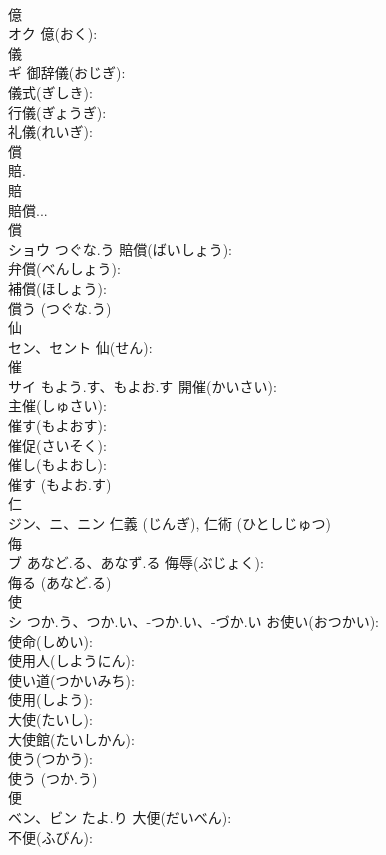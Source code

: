 \documentclass[8pt]{extreport}
\begin{document}
\begin{CJK}{UTF8}{min}
\\	億			
\\	オク		億(おく): 
\\	儀			
\\	ギ		御辞儀(おじぎ): 
\\	儀式(ぎしき): 
\\	行儀(ぎょうぎ): 
\\	礼儀(れいぎ): 
\\	償			
\\	賠. 
\\	賠 
\\	賠償... 
\\	償 
\\	ショウ	つぐな.う	賠償(ばいしょう): 
\\	弁償(べんしょう): 
\\	補償(ほしょう): 
\\	償う (つぐな.う)
\\	仙			
\\	セン、セント		仙(せん): 
\\	催			
\\	サイ	もよう.す、もよお.す	開催(かいさい): 
\\	主催(しゅさい): 
\\	催す(もよおす): 
\\	催促(さいそく): 
\\	催し(もよおし): 
\\	催す (もよお.す)
\\	仁			
\\	ジン、ニ、ニン			仁義 (じんぎ), 仁術 (ひとしじゅつ)
\\	侮			
\\	ブ	あなど.る、あなず.る	侮辱(ぶじょく): 
\\	侮る (あなど.る)
\\	使			
\\	シ	つか.う、つか.い、-つか.い、-づか.い	お使い(おつかい): 
\\	使命(しめい): 
\\	使用人(しようにん): 
\\	使い道(つかいみち): 
\\	使用(しよう): 
\\	大使(たいし): 
\\	大使館(たいしかん): 
\\	使う(つかう): 
\\	使う (つか.う)
\\	便			
\\	ベン、ビン	たよ.り	大便(だいべん): 
\\	不便(ふびん): 

\end{CJK}
\end{document}
